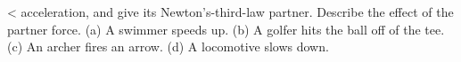  <%
acceleration, and give its Newton's-third-law partner.
Describe the effect of the partner force. (a) A swimmer
speeds up. (b) A golfer hits the ball off of the tee. (c) An
archer fires an arrow. (d) A locomotive slows down.
